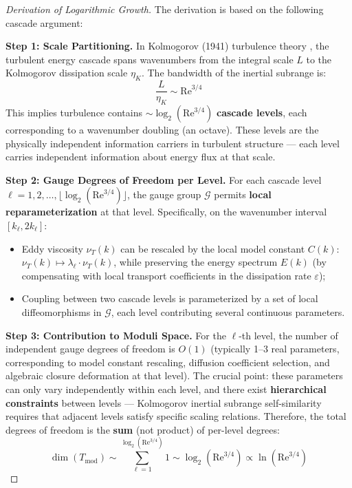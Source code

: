 \documentclass[12pt,a4paper]{article}
\theoremstyle{plain}
\theoremstyle{definition}
\theoremstyle{remark}
\newcommand{\G}{\mathcal{G}}
\newcommand{\Tmod}{T_{\text{mod}}}
\newcommand{\ReNum}{\mathrm{Re}}
\newcommand{\eps}{\varepsilon}
\begin{document}
\begin{proof}[Derivation of Logarithmic Growth]
The derivation is based on the following cascade argument:

\textbf{Step 1: Scale Partitioning.} In Kolmogorov (1941) turbulence theory \cite{kolmogorov1941}, the turbulent energy cascade spans wavenumbers from the integral scale $L$ to the Kolmogorov dissipation scale $\eta_K$. The bandwidth of the inertial subrange is:
\begin{equation}
\frac{L}{\eta_K} \sim \ReNum^{3/4}
\end{equation}
This implies turbulence contains $\sim \log_2(\ReNum^{3/4})$ \textbf{cascade levels}, each corresponding to a wavenumber doubling (an octave). These levels are the physically independent information carriers in turbulent structure --- each level carries independent information about energy flux at that scale.

\textbf{Step 2: Gauge Degrees of Freedom per Level.} For each cascade level $\ell = 1,2,\dots, \lfloor\log_2(\ReNum^{3/4})\rfloor$, the gauge group $\G$ permits \textbf{local reparameterization} at that level. Specifically, on the wavenumber interval $[k_\ell, 2k_\ell]$:
\begin{itemize}
    \item Eddy viscosity $\nu_T(k)$ can be rescaled by the local model constant $C(k)$: $\nu_T(k) \mapsto \lambda_\ell \cdot \nu_T(k)$, while preserving the energy spectrum $E(k)$ (by compensating with local transport coefficients in the dissipation rate $\eps$);
    \item Coupling between two cascade levels is parameterized by a set of local diffeomorphisms in $\G$, each level contributing several continuous parameters.
\end{itemize}

\textbf{Step 3: Contribution to Moduli Space.} For the $\ell$-th level, the number of independent gauge degrees of freedom is $O(1)$ (typically 1--3 real parameters, corresponding to model constant rescaling, diffusion coefficient selection, and algebraic closure deformation at that level). The crucial point: these parameters can only vary independently within each level, and there exist \textbf{hierarchical constraints} between levels --- Kolmogorov inertial subrange self-similarity requires that adjacent levels satisfy specific scaling relations. Therefore, the total degrees of freedom is the \textbf{sum} (not product) of per-level degrees:
\begin{equation}
\dim(\Tmod) \sim \sum_{\ell=1}^{\log_2(\ReNum^{3/4})} 1 \sim \log_2(\ReNum^{3/4}) \propto \ln(\ReNum^{3/4})
\end{equation}


\end{proof}
\end{document}
